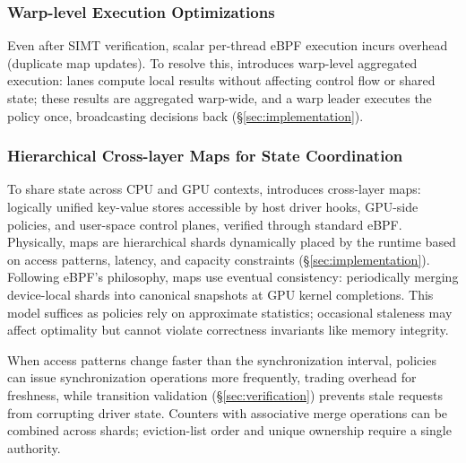 \subsubsection{Warp-level Execution Optimizations}

Even after SIMT verification, scalar per-thread eBPF execution incurs overhead (\eg duplicate map updates).
To resolve this, \sys{} introduces warp-level aggregated execution: lanes compute local results without affecting control flow or shared state; these results are aggregated warp-wide, and a warp leader executes the policy once, broadcasting decisions back (\S\ref{sec:implementation}).

\subsubsection{Hierarchical Cross-layer Maps for State Coordination}
\label{sec:cross-layer-maps}

To share state across CPU and GPU contexts, \sys{} introduces cross-layer maps: logically unified key-value stores accessible by host driver hooks, GPU-side policies, and user-space control planes, verified through standard eBPF.
Physically, maps are hierarchical shards dynamically placed by the runtime based on access patterns, latency, and capacity constraints (\S\ref{sec:implementation}).
Following eBPF's philosophy, \sys{} maps use eventual consistency: periodically merging device-local shards into canonical snapshots at GPU kernel completions.
This model suffices as policies rely on approximate statistics; occasional staleness may affect optimality but cannot violate correctness invariants like memory integrity.

When access patterns change faster than the synchronization interval, policies can issue synchronization operations more frequently, trading overhead for freshness, while transition validation (\S\ref{sec:verification}) prevents stale requests from corrupting driver state.
Counters with associative merge operations can be combined across shards; eviction-list order and unique ownership require a single authority.

